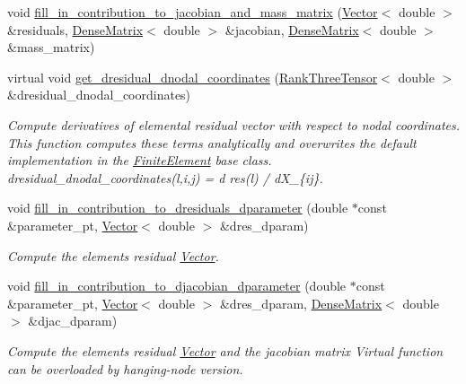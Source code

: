 \begin{DoxyCompactItemize}
void \hyperlink{classoomph_1_1AxisymmetricNavierStokesEquations_ab56a4ee5ee2ffcee5499560ea1b323bc}{fill\+\_\+in\+\_\+contribution\+\_\+to\+\_\+jacobian\+\_\+and\+\_\+mass\+\_\+matrix} (\hyperlink{classoomph_1_1Vector}{Vector}$<$ double $>$ \&residuals, \hyperlink{classoomph_1_1DenseMatrix}{Dense\+Matrix}$<$ double $>$ \&jacobian, \hyperlink{classoomph_1_1DenseMatrix}{Dense\+Matrix}$<$ double $>$ \&mass\+\_\+matrix)
\item 
virtual void \hyperlink{classoomph_1_1AxisymmetricNavierStokesEquations_aea99b11bfac734a5c868aaafffadd820}{get\+\_\+dresidual\+\_\+dnodal\+\_\+coordinates} (\hyperlink{classoomph_1_1RankThreeTensor}{Rank\+Three\+Tensor}$<$ double $>$ \&dresidual\+\_\+dnodal\+\_\+coordinates)
\begin{DoxyCompactList}\small\item\em Compute derivatives of elemental residual vector with respect to nodal coordinates. This function computes these terms analytically and overwrites the default implementation in the \hyperlink{classoomph_1_1FiniteElement}{Finite\+Element} base class. dresidual\+\_\+dnodal\+\_\+coordinates(l,i,j) = d res(l) / d\+X\+\_\+\{ij\}. \end{DoxyCompactList}\item 
void \hyperlink{classoomph_1_1AxisymmetricNavierStokesEquations_aa43f48866735deb28609372232b8cd2a}{fill\+\_\+in\+\_\+contribution\+\_\+to\+\_\+dresiduals\+\_\+dparameter} (double $\ast$const \&parameter\+\_\+pt, \hyperlink{classoomph_1_1Vector}{Vector}$<$ double $>$ \&dres\+\_\+dparam)
\begin{DoxyCompactList}\small\item\em Compute the element\textquotesingle{}s residual \hyperlink{classoomph_1_1Vector}{Vector}. \end{DoxyCompactList}\item 
void \hyperlink{classoomph_1_1AxisymmetricNavierStokesEquations_ad8ac18903e3e4e63301bfe67d5e08361}{fill\+\_\+in\+\_\+contribution\+\_\+to\+\_\+djacobian\+\_\+dparameter} (double $\ast$const \&parameter\+\_\+pt, \hyperlink{classoomph_1_1Vector}{Vector}$<$ double $>$ \&dres\+\_\+dparam, \hyperlink{classoomph_1_1DenseMatrix}{Dense\+Matrix}$<$ double $>$ \&djac\+\_\+dparam)
\begin{DoxyCompactList}\small\item\em Compute the element\textquotesingle{}s residual \hyperlink{classoomph_1_1Vector}{Vector} and the jacobian matrix Virtual function can be overloaded by hanging-\/node version. \end{DoxyCompactList}\item 

\end{DoxyCompactItemize}

